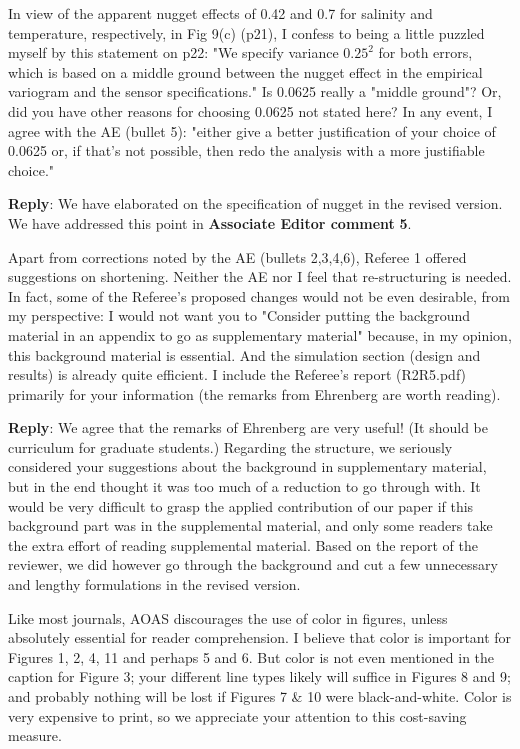 \documentclass[a4paper]{article}
\newcounter{reviewer}
\def\aecom{\textbf{Associate Editor comment }}
\def\reply{\textbf{Reply}}
\begin{document}
\vspace{5mm}
 In view of the apparent nugget effects of 0.42 and 0.7 for salinity
and temperature, respectively, in Fig 9(c) (p21), I confess to being
a little puzzled myself by this statement on p22:
"We specify variance $0.25^2$ for both errors, which is based on a
middle ground between the nugget effect in the empirical variogram
and the sensor specifications."  Is 0.0625 really a "middle ground"?
Or, did you have other reasons for choosing 0.0625 not stated here?
In any event, I agree with the AE (bullet 5): "either give a better
justification of your choice of 0.0625 or, if that’s not possible,
then redo the analysis with a more justifiable choice."

\vspace{5mm}
\reply: We have elaborated on the specification of nugget in the revised version. We have addressed this point in \aecom \textbf{5}. 

\vspace{5mm}
 Apart from corrections noted by the AE (bullets 2,3,4,6), Referee 1
offered suggestions on shortening. Neither the AE nor I feel that re-structuring is needed.  In fact, some of the Referee's proposed changes would not be even desirable, from my perspective: I would not want you to "Consider putting the background material in an appendix to go as supplementary material" because, in my opinion, this background material is essential. And the simulation section (design and results) is already quite efficient. I include the Referee's report (R2R5.pdf) primarily for your information (the remarks from Ehrenberg are worth reading).

\vspace{5mm}
\reply: We agree that the remarks of Ehrenberg are very useful! (It should be curriculum for graduate students.) Regarding the structure, we seriously considered your suggestions about the background in supplementary material, but in the end thought it was too much of a reduction to go through with. It would be very difficult to grasp the applied contribution of our paper if this background part was in the supplemental material, and only some readers take the extra effort of reading supplemental material. Based on the report of the reviewer, we did however go through the background and cut a few unnecessary and lengthy formulations in the revised version.

\vspace{5mm}
 Like most journals, AOAS discourages the use of color in figures,
unless absolutely essential for reader comprehension.  I believe
that color is important for Figures 1, 2, 4, 11 and perhaps 5 and 6.
But color is not even mentioned in the caption for Figure 3; your
different line types likely will suffice in Figures 8 and 9; and
probably nothing will be lost if Figures 7 & 10 were black-and-white.
Color is very expensive to print, so we appreciate your attention
to this cost-saving measure.
\end{document}

